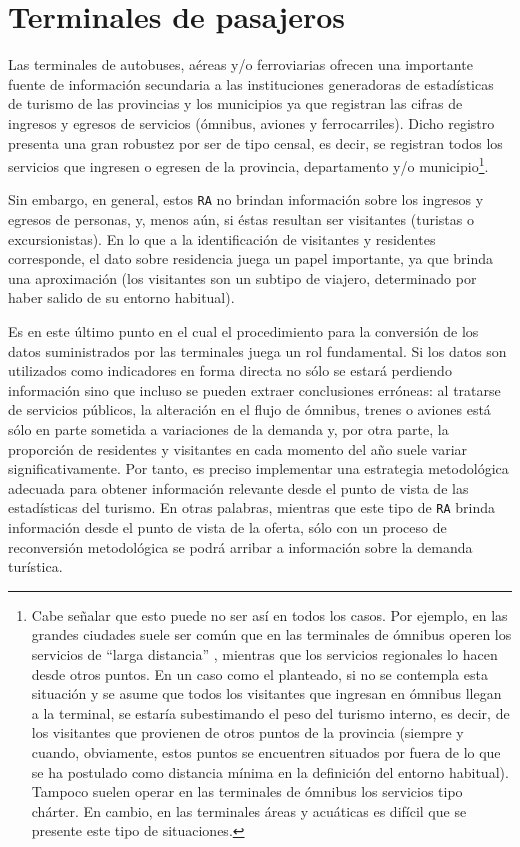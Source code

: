 \documentclass[
]{book}
\begin{document}
\hypertarget{terminales-de-pasajeros}{%
\section{Terminales de pasajeros}\label{terminales-de-pasajeros}}

\hfill\break
Las terminales de autobuses, aéreas y/o ferroviarias ofrecen una importante fuente de información secundaria a las instituciones generadoras de estadísticas de turismo de las provincias y los municipios ya que registran las cifras de ingresos y egresos de servicios (ómnibus, aviones y ferrocarriles). Dicho registro presenta una gran robustez por ser de tipo censal, es decir, se registran todos los servicios que ingresen o egresen de la provincia, departamento y/o municipio\footnote{Cabe señalar que esto puede no ser así en todos los casos. Por ejemplo, en las grandes ciudades suele ser común que en las terminales de ómnibus operen los servicios de ``larga distancia'' , mientras que los servicios regionales lo hacen desde otros puntos. En un caso como el planteado, si no se contempla esta situación y se asume que todos los visitantes que ingresan en ómnibus llegan a la terminal, se estaría subestimando el peso del turismo interno, es decir, de los visitantes que provienen de otros puntos de la provincia (siempre y cuando, obviamente, estos puntos se encuentren situados por fuera de lo que se ha postulado como distancia mínima en la definición del entorno habitual). Tampoco suelen operar en las terminales de ómnibus los servicios tipo chárter. En cambio, en las terminales áreas y acuáticas es difícil que se presente este tipo de situaciones.}.

Sin embargo, en general, estos \texttt{RA} no brindan información sobre los ingresos y egresos de personas, y, menos aún, si éstas resultan ser visitantes (turistas o excursionistas). En lo que a la identificación de visitantes y residentes corresponde, el dato sobre residencia juega un papel importante, ya que brinda una aproximación (los visitantes son un subtipo de viajero, determinado por haber salido de su entorno habitual).

Es en este último punto en el cual el procedimiento para la conversión de los datos suministrados por las terminales juega un rol fundamental. Si los datos son utilizados como indicadores en forma directa no sólo se estará perdiendo información sino que incluso se pueden extraer conclusiones erróneas: al tratarse de servicios públicos, la alteración en el flujo de ómnibus, trenes o aviones está sólo en parte sometida a variaciones de la demanda y, por otra parte, la proporción de residentes y visitantes en cada momento del año suele variar significativamente. Por tanto, es preciso implementar una estrategia metodológica adecuada para obtener información relevante desde el punto de vista de las estadísticas del turismo. En otras palabras, mientras que este tipo de \texttt{RA} brinda información desde el punto de vista de la oferta, sólo con un proceso de reconversión metodológica se podrá arribar a información sobre la demanda turística.
\end{document}
